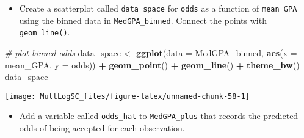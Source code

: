 \documentclass[
]{book}
\newenvironment{Shaded}{\begin{snugshade}}{\end{snugshade}}
\newcommand{\CommentTok}[1]{\textcolor[rgb]{0.56,0.35,0.01}{\textit{#1}}}
\newcommand{\DataTypeTok}[1]{\textcolor[rgb]{0.13,0.29,0.53}{#1}}
\newcommand{\DecValTok}[1]{\textcolor[rgb]{0.00,0.00,0.81}{#1}}
\newcommand{\KeywordTok}[1]{\textcolor[rgb]{0.13,0.29,0.53}{\textbf{#1}}}
\newcommand{\NormalTok}[1]{#1}
\newcommand{\OperatorTok}[1]{\textcolor[rgb]{0.81,0.36,0.00}{\textbf{#1}}}
\newcommand{\StringTok}[1]{\textcolor[rgb]{0.31,0.60,0.02}{#1}}
\providecommand{\tightlist}{%
  \setlength{\itemsep}{0pt}\setlength{\parskip}{0pt}}
\begin{document}
\begin{Shaded}
\end{Shaded}

\begin{itemize}
\tightlist
\item
  Create a scatterplot called \texttt{data\_space} for \texttt{odds} as a function of \texttt{mean\_GPA} using the binned data in \texttt{MedGPA\_binned}. Connect the points with \texttt{geom\_line()}.
\end{itemize}

\begin{Shaded}
\begin{Highlighting}[]
\CommentTok{# plot binned odds}
\NormalTok{data_space <-}\StringTok{ }\KeywordTok{ggplot}\NormalTok{(}\DataTypeTok{data =}\NormalTok{ MedGPA_binned, }
                     \KeywordTok{aes}\NormalTok{(}\DataTypeTok{x =}\NormalTok{ mean_GPA, }\DataTypeTok{y =}\NormalTok{ odds)) }\OperatorTok{+}\StringTok{ }
\StringTok{  }\KeywordTok{geom_point}\NormalTok{() }\OperatorTok{+}\StringTok{ }
\StringTok{  }\KeywordTok{geom_line}\NormalTok{() }\OperatorTok{+}\StringTok{ }
\StringTok{  }\KeywordTok{theme_bw}\NormalTok{()}
\NormalTok{data_space}
\end{Highlighting}
\end{Shaded}

\begin{center}\texttt{[image: MultLogSC\_files/figure-latex/unnamed-chunk-58-1]} \end{center}

\begin{itemize}
\tightlist
\item
  Add a variable called \texttt{odds\_hat} to \texttt{MedGPA\_plus} that records the predicted odds of being accepted for each observation.
\end{itemize}

\begin{Shaded}
\end{Shaded}
\end{document}
